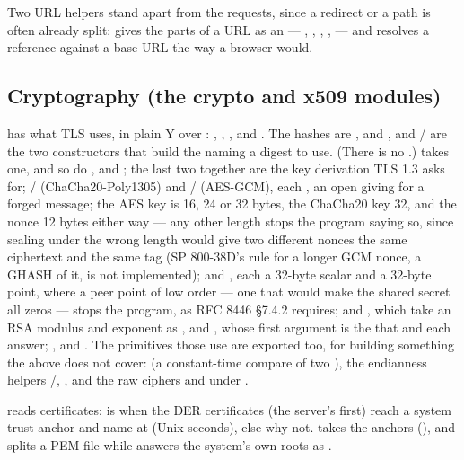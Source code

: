 Two URL helpers stand apart from the requests, since a redirect or a
 path is often already split:  gives
the parts of a URL as an  --- , , ,
,  --- and  resolves a
reference against a base URL the way a browser would.

\subsection{Cryptography (the crypto and x509 modules)}
\label{sec:builtin-crypto}

 has what TLS uses, in plain Y over \ic{[byte]}:
, , , and .
The hashes are , 
and , and  /
 are the two constructors that build the
 naming a digest to use. (There is no
.)  takes one, and so do ,
 and ; the last two
together are the key derivation TLS 1.3 asks for;
/ (ChaCha20-Poly1305) and
/ (AES-GCM), each , an open giving  for a forged message; the AES key is 16,
24 or 32 bytes, the ChaCha20 key 32, and the nonce 12 bytes either way ---
any other length stops the program saying so, since sealing under the
wrong length would give two different nonces the same ciphertext and the
same tag (SP 800-38D's rule for a longer GCM nonce, a GHASH of it, is not
implemented);  and , each a 32-byte scalar
and a 32-byte point, where a peer point of low order --- one that would
make the shared secret all zeros --- stops the program, as RFC 8446
\S7.4.2 requires;  and , which
take an RSA modulus and exponent as \ic{[byte]}, and ,
whose first argument is the  that
 and  each answer;
,  and . The primitives those
use are exported too, for building something the above does not cover:
 (a constant-time compare of two \ic{[byte]}), the
endianness helpers /, , and the
raw ciphers  and  under .

 reads certificates:  is  when the DER certificates  (the
server's first) reach a system trust anchor and name  at
 (Unix seconds), else why not.  takes
the anchors (), and 
splits a PEM file while  answers the system's own
roots as \ic{[x509.Cert]}.

